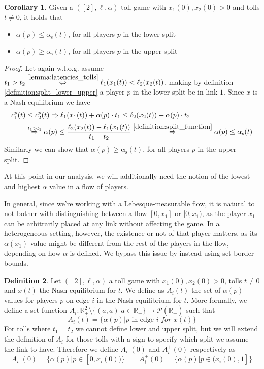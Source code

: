 \documentclass[10pt,a4paper]{book}
\newcommand{\RightarrowArg}[1]{\stackrel{#1}{\Rightarrow}}
\newcommand{\LeftrightarrowArg}[1]{\stackrel{#1}{\Leftrightarrow}}
\newcommand{\as}{\mathrm{\alpha_s}}
\newcommand{\R}{\mathbb{R}}
\theoremstyle{definition}
\newtheorem{definition}{Definition}[chapter]
\newtheorem{corollary}[definition]{Corollary}
\theoremstyle{comment}
\begin{document}
\begin{corollary}
	\label{corollary:split_to_alpha}
	Given a $([2], \ell, \alpha)$ toll game with $x_1(0), x_2(0) > 0$ and tolls $t \ne 0$, it holds that
	\begin{itemize}
		\item $\alpha(p) \le \as(t)$, for all players $p$ in the lower split
		\item $\alpha(p) \ge \as(t)$, for all players $p$ in the upper split
	\end{itemize}
\end{corollary}

\begin{proof}
	Let again w.l.o.g. assume $t_1 > t_2 \LeftrightarrowArg{\ref{lemma:latencies_tolls}} \ell_1(x_1(t)) < \ell_2(x_2(t))$, making by definition \ref{definition:split_lower_upper} a player $p$ in the lower split be in link $1$.
	Since $x$ is a Nash equilibrium we have
	\begin{align*}
		c_1^p(t) &\le c_2^p(t) \Rightarrow \ell_1(x_1(t)) + \alpha(p) \cdot t_1 \le \ell_2(x_2(t)) + \alpha(p) \cdot t_2 \\
		&\RightarrowArg{t_1 > t_2} \alpha(p) \le \frac{\ell_2(x_2(t)) - \ell_1(x_1(t))}{t_1 - t_2} \RightarrowArg{\ref{definition:split_function}} \alpha(p) \le \as(t)
	\end{align*}
	Similarly we can show that $\alpha(p) \ge \as(t)$, for all players $p$ in the upper split.
\end{proof}

At this point in our analysis, we will additionally need the notion of the lowest and highest $\alpha$ value in a flow of players.

In general, since we're working with a Lebesque-measurable flow, it is natural to not bother with distinguishing between a flow $[0, x_1]$ or $[0, x_1)$, as the player $x_1$ can be arbitrarily placed at any link without affecting the game.
In a heterogeneous setting, however, the existence or not of that player matters, as its $\alpha(x_1)$ value might be different from the rest of the players in the flow, depending on how $\alpha$ is defined.
We bypass this issue by instead using set border bounds.

\begin{definition}
	\label{definition:alpha_flow_sets}
	Let $([2], \ell, \alpha)$ a toll game with $x_1(0), x_2(0) > 0$, tolls $t \ne 0$ and $x(t)$ the Nash equilibrium for $t$.
	We define as $A_i(t)$ the set of $\alpha(p)$ values for players $p$ on edge $i$ in the Nash equilibrium for $t$.
	More formally, we define a set function $A_i: \R_+^2 \setminus \{(a, a) | a \in \R_+\} \rightarrow \mathcal{P}(\R_+)$ such that
	\[A_i(t) = \{\alpha(p)|p \text{ in edge } i \textit{ for } x(t) \}\]
	For tolls where $t_1 = t_2$ we cannot define lower and upper split, but we will extend the definition of $A_i$ for those tolls with a sign to specify which split we assume the link to have.
	Therefore we define $A_i^-(0)$ and $A_i^+(0)$ respectively as
	\[A_i^-(0) = \{\alpha(p)|p \in [0, x_i(0))\} \qquad A_i^+(0) = \{\alpha(p)|p \in (x_i(0), 1]\}\]
\end{definition}
\end{document}
